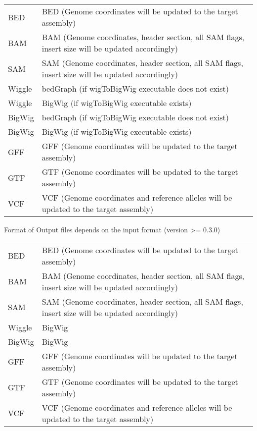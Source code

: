 \documentclass[letterpaper,10pt,english]{sphinxmanual}
\begin{document}
\noindent\begin{tabulary}{\linewidth}{|L|L|}
\hline
{}\relax &\relax \\
\hline
BED
&
BED (Genome coordinates will be updated to the target assembly)
\\
\hline
BAM
&
BAM (Genome coordinates, header section, all SAM flags, insert size will be updated accordingly)
\\
\hline
SAM
&
SAM (Genome coordinates, header section, all SAM flags, insert size will be updated accordingly)
\\
\hline
Wiggle
&
bedGraph (if wigToBigWig executable does not exist)
\\
\hline
Wiggle
&
BigWig (if wigToBigWig executable exists)
\\
\hline
BigWig
&
bedGraph (if wigToBigWig executable does not exist)
\\
\hline
BigWig
&
BigWig (if wigToBigWig executable exists)
\\
\hline
GFF
&
GFF (Genome coordinates will be updated to the target assembly)
\\
\hline
GTF
&
GTF (Genome coordinates will be updated to the target assembly)
\\
\hline
VCF
&
VCF (Genome coordinates and reference alleles will be updated to the target assembly)
\\
\hline\end{tabulary}


Format of Output files depends on the input format (version \textgreater{}= 0.3.0)

\noindent\begin{tabulary}{\linewidth}{|L|L|}
\hline
{}\relax &\relax \\
\hline
BED
&
BED (Genome coordinates will be updated to the target assembly)
\\
\hline
BAM
&
BAM (Genome coordinates, header section, all SAM flags, insert size will be updated accordingly)
\\
\hline
SAM
&
SAM (Genome coordinates, header section, all SAM flags, insert size will be updated accordingly)
\\
\hline
Wiggle
&
BigWig
\\
\hline
BigWig
&
BigWig
\\
\hline
GFF
&
GFF (Genome coordinates will be updated to the target assembly)
\\
\hline
GTF
&
GTF (Genome coordinates will be updated to the target assembly)
\\
\hline
VCF
&
VCF (Genome coordinates and reference alleles will be updated to the target assembly)
\\
\hline\end{tabulary}
\end{document}
